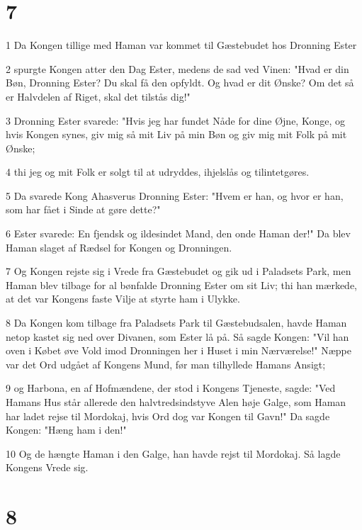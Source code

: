\chapter{7}

\par 1 Da Kongen tillige med Haman var kommet til Gæstebudet hos Dronning Ester
\par 2 spurgte Kongen atter den Dag Ester, medens de sad ved Vinen: "Hvad er din Bøn, Dronning Ester? Du skal få den opfyldt. Og hvad er dit Ønske? Om det så er Halvdelen af Riget, skal det tilstås dig!"
\par 3 Dronning Ester svarede: "Hvis jeg har fundet Nåde for dine Øjne, Konge, og hvis Kongen synes, giv mig så mit Liv på min Bøn og giv mig mit Folk på mit Ønske;
\par 4 thi jeg og mit Folk er solgt til at udryddes, ihjelslås og tilintetgøres.
\par 5 Da svarede Kong Ahasverus Dronning Ester: "Hvem er han, og hvor er han, som har fået i Sinde at gøre dette?"
\par 6 Ester svarede: En fjendsk og ildesindet Mand, den onde Haman der!" Da blev Haman slaget af Rædsel for Kongen og Dronningen.
\par 7 Og Kongen rejste sig i Vrede fra Gæstebudet og gik ud i Paladsets Park, men Haman blev tilbage for al bønfalde Dronning Ester om sit Liv; thi han mærkede, at det var Kongens faste Vilje at styrte ham i Ulykke.
\par 8 Da Kongen kom tilbage fra Paladsets Park til Gæstebudsalen, havde Haman netop kastet sig ned over Divanen, som Ester lå på. Så sagde Kongen: "Vil han oven i Købet øve Vold imod Dronningen her i Huset i min Nærværelse!" Næppe var det Ord udgået af Kongens Mund, før man tilhyllede Hamans Ansigt;
\par 9 og Harbona, en af Hofmændene, der stod i Kongens Tjeneste, sagde: "Ved Hamans Hus står allerede den halvtredsindstyve Alen høje Galge, som Haman har ladet rejse til Mordokaj, hvis Ord dog var Kongen til Gavn!" Da sagde Kongen: "Hæng ham i den!"
\par 10 Og de hængte Haman i den Galge, han havde rejst til Mordokaj. Så lagde Kongens Vrede sig.

\chapter{8}

